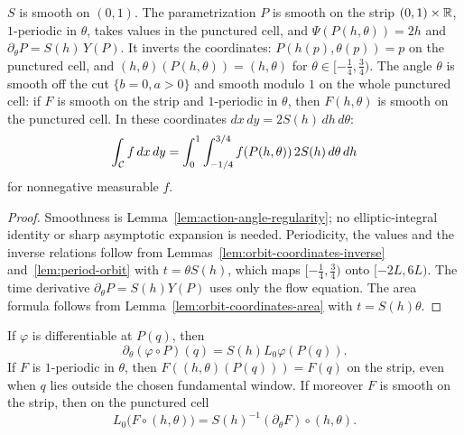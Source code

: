 \begin{lemma}
\label{lem:action-angle-chart}
\leanok
$S$ is smooth on $(0,1)$. The parametrization $P$ is smooth on the strip $(0,1)\times\mathbb{R}$,
$1$-periodic in $\theta$, takes values in the punctured cell, and $\Psi(P(h,\theta))=2h$ and
$\partial_\theta P=S(h)\,Y(P)$. It inverts the coordinates: $P(h(p),\theta(p))=p$ on the
punctured cell, and $(h,\theta)(P(h,\theta))=(h,\theta)$ for $\theta\in[-\frac14,\frac34)$. The angle
$\theta$ is smooth off the cut $\{b=0,a>0\}$ and smooth modulo $1$ on the whole punctured
cell: if $F$ is smooth on the strip and $1$-periodic in $\theta$, then $F(h,\theta)$ is smooth on
the punctured cell. In these coordinates $dx\,dy=2S(h)\,dh\,d\theta$:
\[
  \int_{\mathcal{C}} f\,dx\,dy=\int_0^1\int_{-1/4}^{3/4}f(P(h,\theta))\,2S(h)\,d\theta\,dh
\]
for nonnegative measurable $f$.
\end{lemma}

\begin{proof}
\leanok
Smoothness is Lemma~\ref{lem:action-angle-regularity}; no elliptic-integral
identity or sharp asymptotic expansion is needed. Periodicity, the values
and the inverse relations follow from Lemmas~\ref{lem:orbit-coordinates-inverse}
and~\ref{lem:period-orbit} with $t=\theta S(h)$, which maps
$[-\frac14,\frac34)$ onto $[-2L,6L)$. The time derivative
$\partial_\theta P=S(h)Y(P)$ uses only the flow equation.
The area formula follows from Lemma~\ref{lem:orbit-coordinates-area}
with $t=S(h)\theta$.
\end{proof}

\begin{lemma}
\label{lem:action-angle-test-chain}
\leanok
If $\varphi$ is differentiable at $P(q)$, then
\[
  \partial_\theta(\varphi\circ P)(q)=S(h)L_0\varphi(P(q)).
\]
If $F$ is $1$-periodic in $\theta$, then
$F((h,\theta)(P(q)))=F(q)$ on the strip, even when $q$ lies outside
the chosen fundamental window. If moreover $F$ is smooth on the strip,
then on the punctured cell
\[
  L_0\bigl(F\circ(h,\theta)\bigr)
    =S(h)^{-1}(\partial_\theta F)\circ(h,\theta).
\]
\end{lemma}

